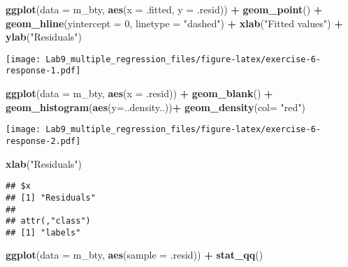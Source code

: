 \documentclass[
]{article}
\newenvironment{Shaded}{\begin{snugshade}}{\end{snugshade}}
\newcommand{\AttributeTok}[1]{\textcolor[rgb]{0.13,0.29,0.53}{#1}}
\newcommand{\DecValTok}[1]{\textcolor[rgb]{0.00,0.00,0.81}{#1}}
\newcommand{\FunctionTok}[1]{\textcolor[rgb]{0.13,0.29,0.53}{\textbf{#1}}}
\newcommand{\NormalTok}[1]{#1}
\newcommand{\SpecialCharTok}[1]{\textcolor[rgb]{0.81,0.36,0.00}{\textbf{#1}}}
\newcommand{\StringTok}[1]{\textcolor[rgb]{0.31,0.60,0.02}{#1}}
\begin{document}
\begin{Shaded}
\begin{Highlighting}[]
\FunctionTok{ggplot}\NormalTok{(}\AttributeTok{data =}\NormalTok{ m\_bty, }\FunctionTok{aes}\NormalTok{(}\AttributeTok{x =}\NormalTok{ .fitted, }\AttributeTok{y =}\NormalTok{ .resid)) }\SpecialCharTok{+}
  \FunctionTok{geom\_point}\NormalTok{() }\SpecialCharTok{+}
  \FunctionTok{geom\_hline}\NormalTok{(}\AttributeTok{yintercept =} \DecValTok{0}\NormalTok{, }\AttributeTok{linetype =} \StringTok{"dashed"}\NormalTok{) }\SpecialCharTok{+}
  \FunctionTok{xlab}\NormalTok{(}\StringTok{"Fitted values"}\NormalTok{) }\SpecialCharTok{+}
  \FunctionTok{ylab}\NormalTok{(}\StringTok{"Residuals"}\NormalTok{)}
\end{Highlighting}
\end{Shaded}

\texttt{[image: Lab9\_multiple\_regression\_files/figure-latex/exercise-6-response-1.pdf]}

\begin{Shaded}
\begin{Highlighting}[]
\FunctionTok{ggplot}\NormalTok{(}\AttributeTok{data =}\NormalTok{ m\_bty, }\FunctionTok{aes}\NormalTok{(}\AttributeTok{x =}\NormalTok{ .resid)) }\SpecialCharTok{+}
  \FunctionTok{geom\_blank}\NormalTok{() }\SpecialCharTok{+}
  \FunctionTok{geom\_histogram}\NormalTok{(}\FunctionTok{aes}\NormalTok{(}\AttributeTok{y=}\NormalTok{..density..))}\SpecialCharTok{+}
  \FunctionTok{geom\_density}\NormalTok{(}\AttributeTok{col=} \StringTok{"red"}\NormalTok{)}
\end{Highlighting}
\end{Shaded}

\texttt{[image: Lab9\_multiple\_regression\_files/figure-latex/exercise-6-response-2.pdf]}

\begin{Shaded}
\begin{Highlighting}[]
  \FunctionTok{xlab}\NormalTok{(}\StringTok{"Residuals"}\NormalTok{) }
\end{Highlighting}
\end{Shaded}

\begin{verbatim}
## $x
## [1] "Residuals"
## 
## attr(,"class")
## [1] "labels"
\end{verbatim}

\begin{Shaded}
\begin{Highlighting}[]
\FunctionTok{ggplot}\NormalTok{(}\AttributeTok{data =}\NormalTok{ m\_bty, }\FunctionTok{aes}\NormalTok{(}\AttributeTok{sample =}\NormalTok{ .resid)) }\SpecialCharTok{+}
  \FunctionTok{stat\_qq}\NormalTok{()}
\end{Highlighting}
\end{Shaded}
\end{document}
